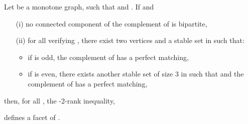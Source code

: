\begin{tthm} \label{T2RANK2}
Let  be a monotone graph,  such that  and .
If  and
\begin{enumerate}
\item[(i)] no connected component of the complement of  is bipartite,
\item[(ii)] for all  verifying , there exist two
vertices  and a stable set  in  such that:
\begin{itemize}
\item if  is odd, the complement of  has a perfect matching,
\item if  is even, there exists another stable set  of size 3 in  such that
 and the complement of  has a perfect matching,
\end{itemize}
\end{enumerate}
then, for all , the -2-rank inequality, \ie

defines a facet of .
\end{tthm}
